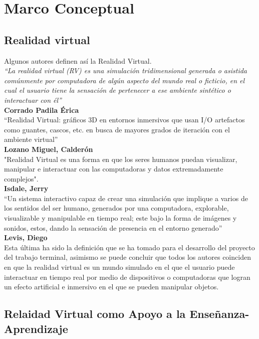\chapter{Marco Conceptual}

\section{Realidad virtual}
Algunos autores definen así la Realidad Virtual.\\
\newline
\textit{“La realidad virtual (RV) es una simulación tridimensional generada o asistida comúnmente por computadora de algún aspecto del mundo real o ficticio, en el cual 
el usuario tiene la sensación de pertenecer a ese ambiente sintético o interactuar con él”}\cite{web6}\\ 
\textbf{Corrado Padila Érica}\\
\newline
“Realidad Virtual: gráficos 3D en entornos inmersivos que usan I/O
artefactos como guantes, cascos, etc. en busca de mayores grados de iteración
con el ambiente virtual”\cite{web7}\\ 
\textbf{Lozano Miguel, Calderón}\\
\newline
"Realidad Virtual es una forma en que los seres humanos puedan
visualizar, manipular e interactuar con las computadoras y datos extremadamente
complejos".\cite{web8}\\
\textbf{Isdale, Jerry}\\
\newline
“Un sistema interactivo capaz de crear una simulación que implique a varios de los sentidos del ser humano, generados por una computadora, explorable, visualizable y manipulable 
en tiempo real; este bajo la forma de imágenes y sonidos, estos, dando la sensación de presencia en el entorno generado”\cite{web9}\\
\textbf{Levis, Diego}\\
\newline
Esta última ha sido la definición que se ha tomado para el desarrollo del proyecto del trabajo terminal, asimismo se puede concluir que todos los autores coinciden en que la 
realidad virtual es un mundo simulado en el que el usuario puede interactuar en tiempo real por medio
de dispositivos o computadoras que logran un efecto artificial e inmersivo en el que se pueden manipular objetos.

\section{Relaidad Virtual como Apoyo a la Enseñanza-Aprendizaje}


